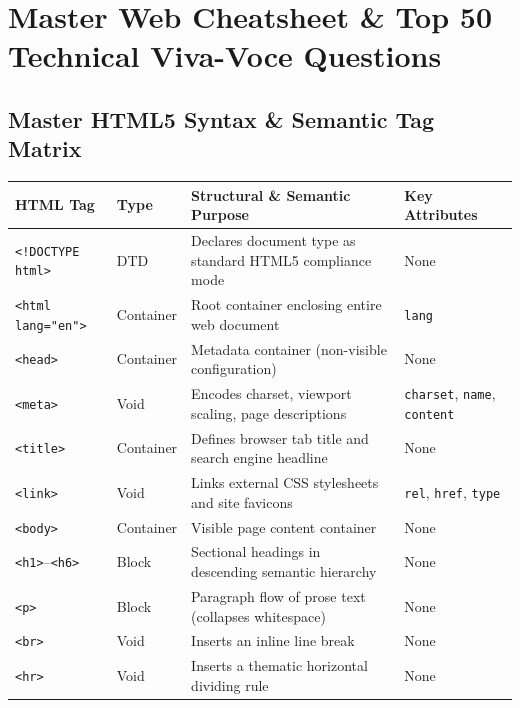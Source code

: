 \chapter{Master Web Cheatsheet \& Top 50 Technical Viva-Voce Questions}
\label{chap:master-web-cheatsheet}

\section{Master HTML5 Syntax \& Semantic Tag Matrix}

\begin{table}[htbp]
\centering
\small
\renewcommand{\arraystretch}{1.2}
\begin{tabularx}{\linewidth}{ll>{\raggedright\arraybackslash}Xl}
\toprule
\textbf{HTML Tag} & \textbf{Type} & \textbf{Structural \& Semantic Purpose} & \textbf{Key Attributes} \\
\midrule
\texttt{<!DOCTYPE html>} & DTD & Declares document type as standard HTML5 compliance mode & None \\
\texttt{<html lang="en">} & Container & Root container enclosing entire web document & \texttt{lang} \\
\texttt{<head>} & Container & Metadata container (non-visible configuration) & None \\
\texttt{<meta>} & Void & Encodes charset, viewport scaling, page descriptions & \texttt{charset}, \texttt{name}, \texttt{content} \\
\texttt{<title>} & Container & Defines browser tab title and search engine headline & None \\
\texttt{<link>} & Void & Links external CSS stylesheets and site favicons & \texttt{rel}, \texttt{href}, \texttt{type} \\
\texttt{<body>} & Container & Visible page content container & None \\
\texttt{<h1>}--\texttt{<h6>} & Block & Sectional headings in descending semantic hierarchy & None \\
\texttt{<p>} & Block & Paragraph flow of prose text (collapses whitespace) & None \\
\texttt{<br>} & Void & Inserts an inline line break & None \\
\texttt{<hr>} & Void & Inserts a thematic horizontal dividing rule & None \\

\end{tabularx}
\end{table}
